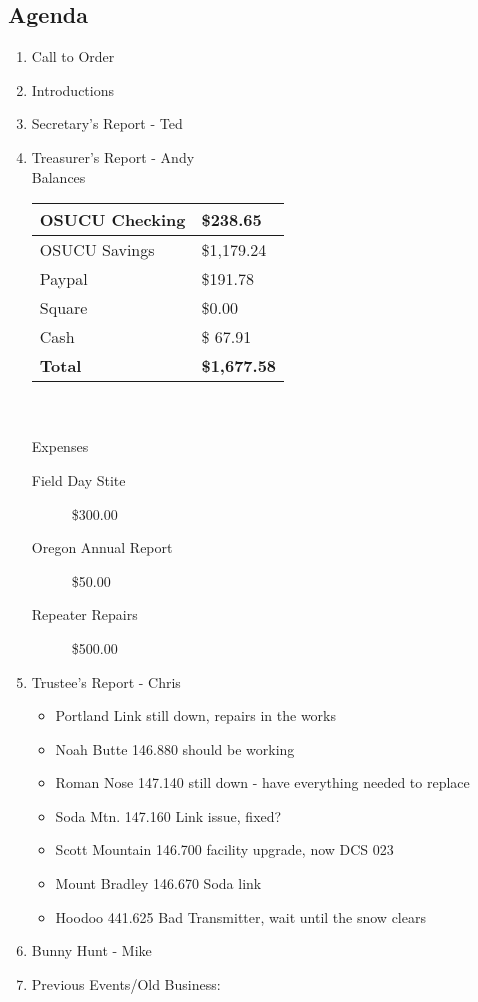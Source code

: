 \documentclass[letter,11pt]{extarticle}
\begin{document}
	\subsection*{Agenda}
	\begin{enumerate}
		\item Call to Order
		\item Introductions
		\item Secretary's Report - Ted
		\item Treasurer's Report - Andy \\
				Balances \\
			\begin{tabular}{|l|l|} \hline
				OSUCU Checking & \$238.65 \\ \hline
				OSUCU Savings & \$1,179.24 \\ \hline
				Paypal & \$191.78 \\ \hline
				Square & \$0.00 \\ \hline
				Cash & \$ 67.91 \\ \hline
				\textbf{Total} & \textbf{\$1,677.58} \\ \hline
			\end{tabular} \\ \\
			Expenses
			\begin{description}
				\item[Field Day Stite] \$300.00
				\item[Oregon Annual Report] \$50.00
				\item[Repeater Repairs] \$500.00
			\end{description}
		\item Trustee's Report - Chris
			\begin{itemize}
				\item Portland Link still down, repairs in the works
				\item Noah Butte 146.880 should be working
				\item Roman Nose 147.140 still down - have everything needed to replace
				\item Soda Mtn. 147.160 Link issue, fixed?
				\item Scott Mountain 146.700 facility upgrade, now DCS 023
				\item Mount Bradley 146.670 Soda link
				\item Hoodoo 441.625 Bad Transmitter, wait until the snow clears		
			\end{itemize}
		\item Bunny Hunt - Mike
		\item Previous Events/Old Business:

\end{enumerate}
\end{document}
